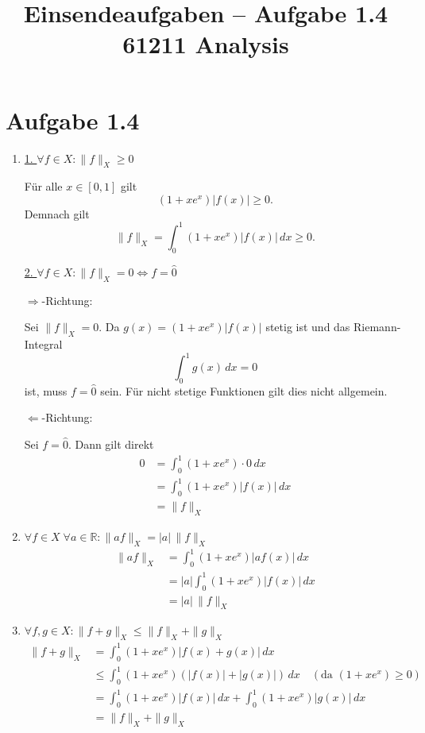 \documentclass[a4paper,12pt]{article}
\title{Einsendeaufgaben -- Aufgabe 1.4\\[0.5em]
\large 61211 Analysis}
\author{}
\date{}
\begin{document}
\maketitle

\section*{Aufgabe 1.4}

\begin{enumerate}[label=(\roman*)]

    \item
    \underline{1. $\forall f \in X : \|f\|_X \geq 0$}

    Für alle $x \in [0, 1]$ gilt
    \[
        (1 + x e^x)|f(x)| \geq 0.
    \]
    Demnach gilt
    \[
        \|f\|_X = \int_0^1 (1 + x e^x)|f(x)|\, dx \geq 0.
    \]

    \underline{2. $\forall f \in X : \|f\|_X = 0 \Longleftrightarrow f = \hat{0}$}

    \glqq$\Rightarrow$\grqq-Richtung:

    Sei $\|f\|_X = 0$. Da $g(x) = (1 + x e^x)|f(x)|$ stetig ist und das Riemann-Integral
    \[
        \int_0^1 g(x)\, dx = 0
    \]
    ist, muss $f = \hat{0}$ sein.
    Für nicht stetige Funktionen gilt dies nicht allgemein.

    \glqq$\Leftarrow$\grqq-Richtung:

    Sei $f = \hat{0}$. Dann gilt direkt
    \begin{align*}
        0 &= \int_0^1 (1 + x e^x) \cdot 0\, dx \\
          &= \int_0^1 (1 + x e^x)|f(x)|\, dx \\
          &= \|f\|_X
    \end{align*}

    \item
    $\forall f \in X\; \forall a \in \mathbb{R} : \|af\|_X = |a|\,\|f\|_X$
    \begin{align*}
        \|af\|_X &= \int_0^1 (1 + x e^x)|af(x)|\, dx \\
                 &= |a| \int_0^1 (1 + x e^x)|f(x)|\, dx \\
                 &= |a|\,\|f\|_X
    \end{align*}

    \item
    $\forall f, g \in X : \|f + g\|_X \leq \|f\|_X + \|g\|_X$
    \begin{align*}
        \|f + g\|_X &= \int_0^1 (1 + x e^x)|f(x) + g(x)|\, dx \\
                    &\leq \int_0^1 (1 + x e^x)(|f(x)| + |g(x)|)\, dx
                    \quad (\text{da } (1 + x e^x) \geq 0) \\
                    &= \int_0^1 (1 + x e^x)|f(x)|\, dx + \int_0^1 (1 + x e^x)|g(x)|\, dx \\
                    &= \|f\|_X + \|g\|_X
    \end{align*}

\end{enumerate}
\end{document}

